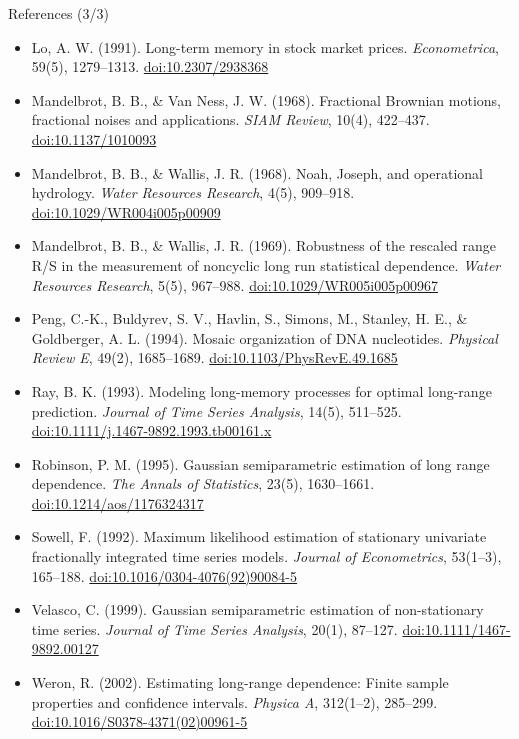 \begin{frame}{References (3/3)}
\itemsize{\scriptsize}
\begin{itemize}
    \item Lo, A. W. (1991). Long-term memory in stock market prices. \textit{Econometrica}, 59(5), 1279--1313. \href{https://doi.org/10.2307/2938368}{doi:10.2307/2938368}
    \item Mandelbrot, B. B., \& Van Ness, J. W. (1968). Fractional Brownian motions, fractional noises and applications. \textit{SIAM Review}, 10(4), 422--437. \href{https://doi.org/10.1137/1010093}{doi:10.1137/1010093}
    \item Mandelbrot, B. B., \& Wallis, J. R. (1968). Noah, Joseph, and operational hydrology. \textit{Water Resources Research}, 4(5), 909--918. \href{https://doi.org/10.1029/WR004i005p00909}{doi:10.1029/WR004i005p00909}
    \item Mandelbrot, B. B., \& Wallis, J. R. (1969). Robustness of the rescaled range R/S in the measurement of noncyclic long run statistical dependence. \textit{Water Resources Research}, 5(5), 967--988. \href{https://doi.org/10.1029/WR005i005p00967}{doi:10.1029/WR005i005p00967}
    \item Peng, C.-K., Buldyrev, S. V., Havlin, S., Simons, M., Stanley, H. E., \& Goldberger, A. L. (1994). Mosaic organization of DNA nucleotides. \textit{Physical Review E}, 49(2), 1685--1689. \href{https://doi.org/10.1103/PhysRevE.49.1685}{doi:10.1103/PhysRevE.49.1685}
    \item Ray, B. K. (1993). Modeling long-memory processes for optimal long-range prediction. \textit{Journal of Time Series Analysis}, 14(5), 511--525. \href{https://doi.org/10.1111/j.1467-9892.1993.tb00161.x}{doi:10.1111/j.1467-9892.1993.tb00161.x}
    \item Robinson, P. M. (1995). Gaussian semiparametric estimation of long range dependence. \textit{The Annals of Statistics}, 23(5), 1630--1661. \href{https://doi.org/10.1214/aos/1176324317}{doi:10.1214/aos/1176324317}
    \item Sowell, F. (1992). Maximum likelihood estimation of stationary univariate fractionally integrated time series models. \textit{Journal of Econometrics}, 53(1--3), 165--188. \href{https://doi.org/10.1016/0304-4076(92)90084-5}{doi:10.1016/0304-4076(92)90084-5}
    \item Velasco, C. (1999). Gaussian semiparametric estimation of non-stationary time series. \textit{Journal of Time Series Analysis}, 20(1), 87--127. \href{https://doi.org/10.1111/1467-9892.00127}{doi:10.1111/1467-9892.00127}
    \item Weron, R. (2002). Estimating long-range dependence: Finite sample properties and confidence intervals. \textit{Physica A}, 312(1--2), 285--299. \href{https://doi.org/10.1016/S0378-4371(02)00961-5}{doi:10.1016/S0378-4371(02)00961-5}
\end{itemize}
\end{frame}


